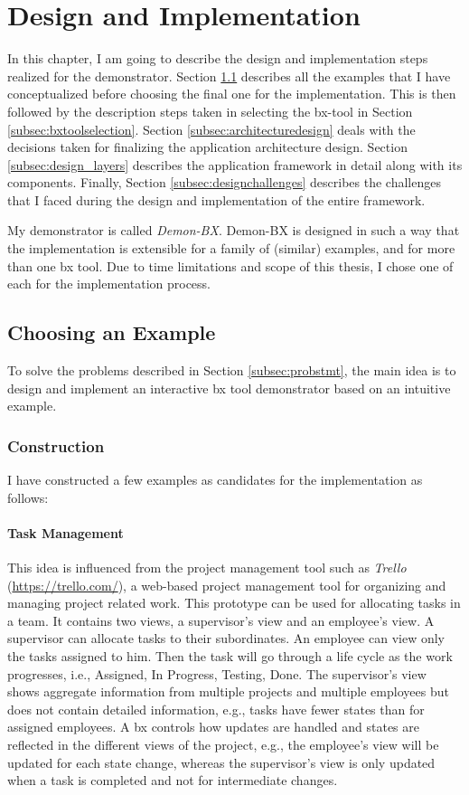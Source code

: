 \section{Design and Implementation}\label{sec:design}
In this chapter, I am going to describe the design and implementation steps realized for the demonstrator. Section \ref{subsec:exampleforimplementation} describes all the examples that I have conceptualized before choosing the final one for the implementation. This is then followed by the description steps taken in selecting the bx-tool in Section \ref{subsec:bxtoolselection}. Section \ref{subsec:architecturedesign} deals with the decisions taken for finalizing the application architecture design. Section \ref{subsec:design_layers} describes the application framework in detail along with its components. Finally, Section \ref{subsec:designchallenges} describes the challenges that I faced during the design and implementation of the entire framework. 

My demonstrator is called \textit{\ac{Demon-BX}}. Demon-BX is designed in such a way that the implementation is extensible for a family of (similar) examples, and for more than one bx tool. Due to time limitations and scope of this thesis, I chose one of each for the implementation process.

\subsection{Choosing an Example}\label{subsec:exampleforimplementation}
To solve the problems described in Section \ref{subsec:probstmt}, the main idea is to design and implement an interactive bx tool demonstrator based on an intuitive example.

\subsubsection{Construction}\label{subsubsec:exampleconstruction}
I have constructed a few examples as candidates for the implementation as follows:

\paragraph{Task Management} This idea is influenced from the project management tool such as \textit{Trello} (\url{https://trello.com/}), a web-based project management tool for organizing and managing project related work. This prototype can be used for allocating tasks in a team. It contains two views, a supervisor's view and an employee's view. A supervisor can allocate tasks to their subordinates. An employee can view only the tasks assigned to him. Then the task will go through a life cycle as the work progresses, i.e., Assigned, In Progress, Testing, Done. The supervisor's view shows aggregate information from multiple projects and multiple employees but does not contain detailed information, e.g., tasks have fewer states than for assigned employees. A bx controls how updates are handled and states are reflected in the different views of the project, e.g., the employee's view will be updated for each state change, whereas the supervisor's view is only updated when a task is completed and not for intermediate changes.

